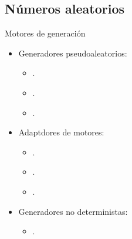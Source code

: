 \subsection{Números aleatorios}

\begin{frame}[t]{Motores de generación}
\begin{itemize}
  \item Generadores pseudoaleatorios:
    \begin{itemize}
      \item {}.
      \item {}.
      \item {}.
    \end{itemize}
  \pause\vfill
  \item Adaptdores de motores:
    \begin{itemize}
      \item {}.
      \item {}.
      \item {}.
    \end{itemize}
  \pause\vfill
  \item Generadores no deterministas:
    \begin{itemize}
      \item {}.
    \end{itemize}
\end{itemize}
\end{frame}


